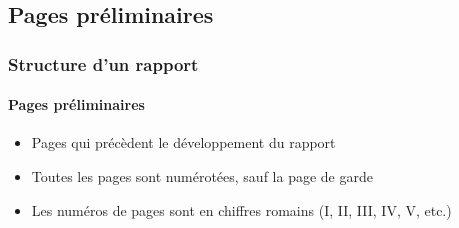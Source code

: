 \documentclass[xcolor=table]{beamer}
\begin{document}
\subsection{Pages préliminaires}

\begin{frame}
\frametitle{Structure d'un rapport}
\framesubtitle{Pages préliminaires}

\begin{itemize}
	\item Pages qui précèdent le développement du rapport
	\item Toutes les pages sont numérotées, sauf la page de garde
	\item Les numéros de pages sont en chiffres romains (I, II, III, IV, V, etc.) 
\end{itemize}

\end{frame}
\end{document}
